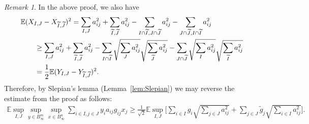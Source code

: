 \documentclass[a4paper]{amsart}
\theoremstyle{definition}
\theoremstyle{remark}
\newtheorem{remark}[theorem]{Remark}
\numberwithin{equation}{section}
\newcommand*{\EE}{\mathbb{E}}
\begin{document}
\begin{remark}
\label{rem:sidenote-Slepian-wrong}
In the above proof, we also have
		\begin{align*}
		\MoveEqLeft \EE (X_{I,J} - X_{\widetilde{I}, \widetilde{J}})^2
		= \sum_{ I, J} a_{ij}^2
		+ \sum_{\widetilde{I},\widetilde{J}} a_{ij}^2
		-  \sum_{I\cap \widetilde{I}, J\cap \widetilde{J} } a_{ij}^2
		- \sum_{J\cap \widetilde{J}, I\cap \widetilde{I}}  a_{ij}^2\\
		&\geq \sum_{ I, J} a_{ij}^2
		+ \sum_{\widetilde{I},\widetilde{J}} a_{ij}^2
		-  \sum_{I\cap \widetilde{I}} \sqrt{\sum_{J } a_{ij}^2} \sqrt{\sum_{\widetilde{J} } a_{ij}^2}
		- \sum_{J\cap \widetilde{J} } \sqrt{\sum_{I}  a_{ij}^2} \sqrt{\sum_{ \widetilde{I}}  a_{ij}^2}\\
		&= \frac{1}{2} \EE (Y_{I,J} - Y_{\widetilde{I}, \widetilde{J}})^2.
		\end{align*}	
		Therefore, by Slepian's lemma (Lemma~\ref{lem:Slepian}) we may reverse the estimate from the proof as follows:
		\begin{align*}
		\EE \sup_{I, J} \sup_{y\in B_\infty^m}\sup_{x\in B_\infty^n}
\sum_{i\in I, j\in J} y_i a_{ij} g_{ij} x_j \ge \frac{1}{\sqrt{2}} \EE \sup_{I, J}  \biggl[\sum_{i\in I} g_i \sqrt{\sum_{j\in J} a_{ij}^2 }
+ \sum_{j\in J} \widetilde{g}_j \sqrt{\sum_{i\in I} a_{ij}^2 } \biggr].
		\end{align*}
\end{remark}
\end{document}
